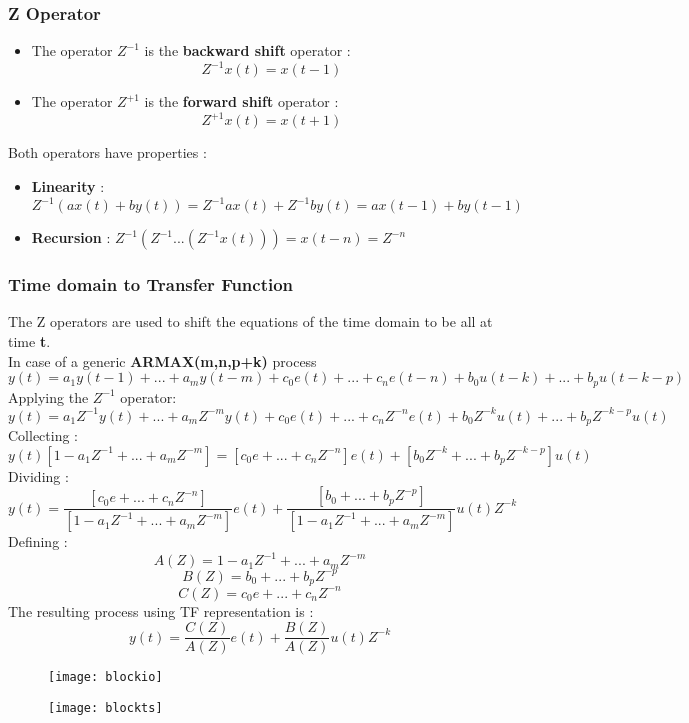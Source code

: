 \subsubsection{Z Operator}
\begin{itemize}
\item The operator $ Z^{-1}$ is the \textbf{backward shift} operator : $$ Z^{-1}x(t) = x(t-1)$$
\item The operator $ Z^{+1}$ is the \textbf{forward shift} operator : $$ Z^{+1}x(t) = x(t+1)$$
\end{itemize}
Both operators have properties : 
\begin{itemize}
\item \textbf{Linearity} : $ Z^{-1}(ax(t)+by(t)) = Z^{-1}ax(t)+Z^{-1}by(t) = ax(t-1)+by(t-1)$
\item \textbf{Recursion} : $ Z^{-1}(Z^{-1}...(Z^{-1}x(t))) = x(t-n) =Z^{-n} $ 
\end{itemize}


\subsubsection{Time domain to Transfer Function}
The Z operators are used to shift the equations of the time domain to be all at time \textbf{t}.\\
In case of a generic \textbf{ARMAX(m,n,p+k)} process 
$$ y(t) = a_1y(t-1)+...+a_my(t-m)+c_0e(t)+...+c_ne(t-n)+b_0u(t-k)+...+b_pu(t-k-p)$$
Applying the $Z^{-1}$ operator:
$$ y(t) = a_1Z^{-1}y(t)+...+a_mZ^{-m}y(t)+c_0e(t)+...+c_nZ^{-n}e(t)+b_0Z^{-k}u(t)+...+b_pZ^{-k-p}u(t)$$
Collecting :
$$ y(t)[1-a_1Z^{-1}+...+a_mZ^{-m}] =[c_0e+...+c_nZ^{-n}]e(t)+[b_0Z^{-k}+...+b_pZ^{-k-p}]u(t)$$
Dividing :
$$ y(t)=\frac{[c_0e+...+c_nZ^{-n}]}{[1-a_1Z^{-1}+...+a_mZ^{-m}]}e(t)+ \frac{[b_0+...+b_pZ^{-p}]}{[1-a_1Z^{-1}+...+a_mZ^{-m}]}u(t)Z^{-k}$$
Defining :
$$ A(Z) = 1-a_1Z^{-1}+...+a_mZ^{-m} $$
$$ B(Z) = b_0+...+b_pZ^{-p} $$
$$ C(Z) = c_0e+...+c_nZ^{-n} $$ 
The resulting process using TF representation is :
$$ y(t) = \frac{C(Z)}{A(Z)}e(t) + \frac{B(Z)}{A(Z)}u(t)Z^{-k} $$
\begin{figure}[!h]
\begin{minipage}{.5\textwidth}
 \centering
  \texttt{[image: blockio]}
\end{minipage}%
	\begin{minipage}{.5\textwidth}
  \centering
  \texttt{[image: blockts]}
\end{minipage}%
\end{figure}

